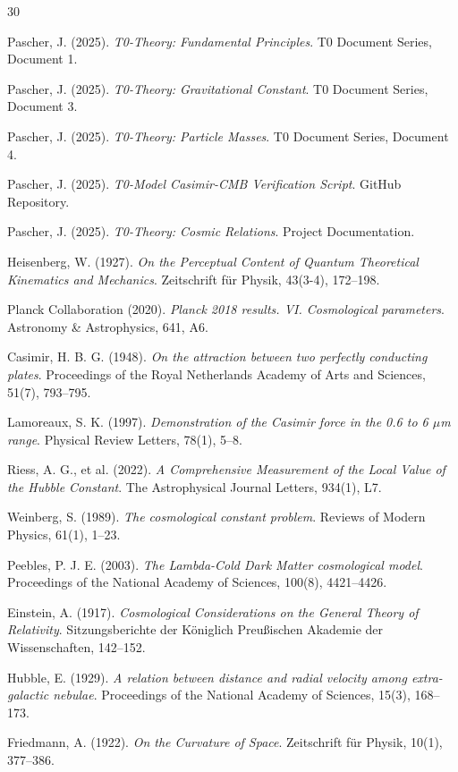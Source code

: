 	
	\begin{thebibliography}{30}
		
		Pascher, J. (2025). 
		\textit{T0-Theory: Fundamental Principles}. 
		T0 Document Series, Document 1.
		
		Pascher, J. (2025). 
		\textit{T0-Theory: Gravitational Constant}. 
		T0 Document Series, Document 3.
		
		Pascher, J. (2025). 
		\textit{T0-Theory: Particle Masses}. 
		T0 Document Series, Document 4.
		
		Pascher, J. (2025). 
		\textit{T0-Model Casimir-CMB Verification Script}. 
		GitHub Repository. 

		Pascher, J. (2025). 
		\textit{T0-Theory: Cosmic Relations}. 
		Project Documentation. 

		Heisenberg, W. (1927). 
		\textit{On the Perceptual Content of Quantum Theoretical Kinematics and Mechanics}. 
		Zeitschrift für Physik, 43(3-4), 172--198.
		
		Planck Collaboration (2020). 
		\textit{Planck 2018 results. VI. Cosmological parameters}. 
		Astronomy \& Astrophysics, 641, A6.
		
		Casimir, H. B. G. (1948). 
		\textit{On the attraction between two perfectly conducting plates}. 
		Proceedings of the Royal Netherlands Academy of Arts and Sciences, 51(7), 793--795.
		
		Lamoreaux, S. K. (1997). 
		\textit{Demonstration of the Casimir force in the 0.6 to 6 $\mu$m range}. 
		Physical Review Letters, 78(1), 5--8.
		
		Riess, A. G., et al. (2022). 
		\textit{A Comprehensive Measurement of the Local Value of the Hubble Constant}. 
		The Astrophysical Journal Letters, 934(1), L7.
		
		Weinberg, S. (1989). 
		\textit{The cosmological constant problem}. 
		Reviews of Modern Physics, 61(1), 1--23.
		
		Peebles, P. J. E. (2003). 
		\textit{The Lambda-Cold Dark Matter cosmological model}. 
		Proceedings of the National Academy of Sciences, 100(8), 4421--4426.
		
		Einstein, A. (1917). 
		\textit{Cosmological Considerations on the General Theory of Relativity}. 
		Sitzungsberichte der Königlich Preußischen Akademie der Wissenschaften, 142--152.
		
		Hubble, E. (1929). 
		\textit{A relation between distance and radial velocity among extra-galactic nebulae}. 
		Proceedings of the National Academy of Sciences, 15(3), 168--173.
		
		Friedmann, A. (1922). 
		\textit{On the Curvature of Space}. 
		Zeitschrift für Physik, 10(1), 377--386.
		
	\end{thebibliography}
	


